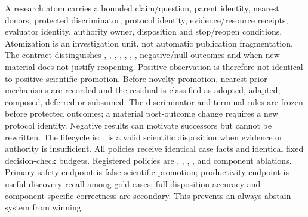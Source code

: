 \markdownRendererDocumentBegin
\markdownRendererSectionBegin
{}\markdownRendererInterblockSeparator
{}A research atom carries a bounded claim/question, parent identity, nearest donors, protected discriminator, protocol identity, evidence/resource receipts, evaluator identity, authority owner, disposition and stop/reopen conditions. Atomization is an investigation unit, not automatic publication fragmentation.\markdownRendererInterblockSeparator
{}The contract distinguishes , , , , , , , negative/null outcomes and  when new material does not justify reopening. Positive observation is therefore not identical to positive scientific promotion.\markdownRendererInterblockSeparator
{}Before novelty promotion, nearest prior mechanisms are recorded and the residual is classified as adopted, adapted, composed, deferred or subsumed. The discriminator and terminal rules are frozen before protected outcomes; a material post-outcome change requires a new protocol identity. Negative results can motivate successors but cannot be rewritten.\markdownRendererInterblockSeparator
{}The lifecycle is:\markdownRendererInterblockSeparator
{}.\markdownRendererInterblockSeparator
{} is a valid scientific disposition when evidence or authority is insufficient.\markdownRendererInterblockSeparator
{}\markdownRendererSectionBegin
{}\markdownRendererInterblockSeparator
{}All policies receive identical case facts and identical fixed decision-check budgets. Registered policies are , , , ,  and component ablations. Primary safety endpoint is false scientific promotion; productivity endpoint is useful-discovery recall among gold  cases; full disposition accuracy and component-specific correctness are secondary. This prevents an always-abstain system from winning.
\markdownRendererSectionEnd 
\markdownRendererSectionEnd \markdownRendererDocumentEnd
